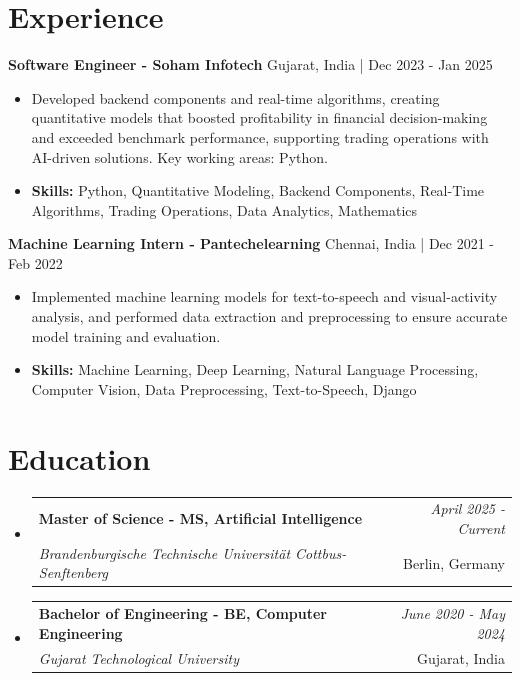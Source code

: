 \documentclass[a4paper,11pt]{article}
\makeatletter
\newcommand{\resumeSubheading}[4]{
\vspace{0.5mm}\item
    \begin{tabular*}{0.98\textwidth}[t]{l@{\extracolsep{\fill}}r}
        \textbf{#1} & \textit{\footnotesize{#4}} \\
        \textit{\footnotesize{#3}} &  \footnotesize{#2}\\
    \end{tabular*}
    \vspace{-2.4mm}
}
\makeatother
\begin{document}
\section{\textbf{Experience}}


\vspace{1mm}
  \textbf{Software Engineer - Soham Infotech} \hfill Gujarat, India | Dec 2023 - Jan 2025
\vspace{-1.5mm} %
\begin{itemize}
  \item Developed backend components and real-time algorithms, creating quantitative models that boosted profitability in financial decision-making and exceeded benchmark performance, supporting trading operations with AI-driven solutions. Key working areas: Python.

\vspace{-2mm}
  \item \textbf{Skills:} Python, Quantitative Modeling, Backend Components, Real-Time Algorithms, Trading Operations, Data Analytics, Mathematics
\end{itemize}

\vspace{1mm}
  \textbf{Machine Learning Intern - Pantechelearning} \hfill Chennai, India | Dec 2021 - Feb 2022
\vspace{-1.5mm} %
\begin{itemize}
  \item Implemented machine learning models for text-to-speech and visual-activity analysis, and performed data extraction and preprocessing to ensure accurate model training and evaluation.
\vspace{-2mm}
  \item \textbf{Skills:} Machine Learning, Deep Learning, Natural Language Processing, Computer Vision, Data Preprocessing, Text-to-Speech, Django
\end{itemize}\section{\textbf{Education}}
\vspace{-0.4mm}

\begin{itemize}
\resumeSubheading
{Master of Science - MS, Artificial Intelligence }{Berlin, Germany}
{Brandenburgische Technische Universität Cottbus-Senftenberg  }{April 2025 - Current}

\vspace{1.0mm} %
\resumeSubheading
{Bachelor of Engineering - BE, Computer Engineering  }{Gujarat, India}
{Gujarat Technological University }{June 2020 - May 2024}

\end{itemize}
\end{document}
